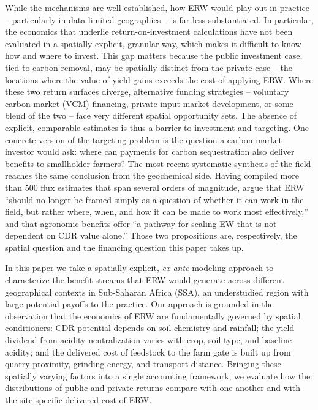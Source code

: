 \documentclass[12pt]{article}
\begin{document}
While the mechanisms are well established, how ERW would play out in
practice -- particularly in data-limited geographies -- is far less
substantiated. In particular, the economics that underlie return-on-investment
calculations have not been evaluated in a spatially explicit, granular way,
which makes it difficult to know how and where to invest. This gap matters
because the public investment case, tied to carbon removal, may be spatially
distinct from the private case -- the locations where the value of yield gains
exceeds the cost of applying ERW. Where these two return surfaces diverge,
alternative funding strategies -- voluntary carbon market (VCM) financing,
private input-market development, or some blend of the two -- face very different
spatial opportunity sets. The absence of explicit, comparable estimates is thus
a barrier to investment and targeting. One concrete version of the targeting
problem is the question a carbon-market investor would ask: where can payments
for carbon sequestration also deliver benefits to smallholder farmers?
The most recent systematic synthesis of the field reaches the same conclusion
from the geochemical side. Having compiled more than 500 flux estimates that
span several orders of magnitude, \citet[\S14.2]{suhrhoff2026esroc} argue that
ERW ``should no longer be framed simply as a question of whether it can work in
the field, but rather where, when, and how it can be made to work most
effectively,'' and that agronomic benefits offer ``a pathway for scaling EW that
is not dependent on CDR value alone.'' Those two propositions are, respectively,
the spatial question and the financing question this paper takes up.

In this paper we take a spatially explicit, \emph{ex ante} modeling approach to
characterize the benefit streams that ERW would generate across different
geographical contexts in Sub-Saharan Africa (SSA), an understudied region with
large potential payoffs to the practice. Our approach is grounded in the
observation that the economics of ERW are fundamentally governed by spatial
conditioners: CDR potential depends on soil chemistry and rainfall; the yield
dividend from acidity neutralization varies with crop, soil type, and baseline
acidity; and the delivered cost of feedstock to the farm gate is built up from
quarry proximity, grinding energy, and transport distance. Bringing these
spatially varying factors into a single accounting framework, we evaluate how
the distributions of public and private returns compare with one another and
with the site-specific delivered cost of ERW.
\end{document}
